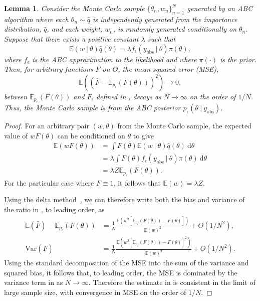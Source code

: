 \documentclass[12pt, onecolumn]{article}
\newcommand{\obs}[1]{#1_{\mathrm{obs}}}
\newtheorem{lemma}[theorem]{Lemma}
\begin{document}
\begin{lemma}
\label{lemma:MC}
Consider the Monte Carlo sample $\{ \theta_n, w_n \}_{n=1}^N$ generated by an ABC algorithm where each $\theta_n \sim \hat q$ is independently generated from the importance distribution, $\hat q$, and each weight, $w_n$, is randomly generated conditionally on $\theta_n$.
Suppose that there exists a positive constant $\lambda$ such that
\begin{equation}
\label{eq:ABCCondition}
\mathbb E(w~|~\theta) \hat q(\theta) = \lambda f_\epsilon(\obs y~|~\theta) \pi(\theta),
\end{equation}
where $f_\epsilon$ is the ABC approximation to the likelihood and where $\pi(\cdot)$ is the prior.
Then, for arbitrary functions $F$ on $\Theta$, the mean squared error (MSE),
\[
\mathbb E\left( \left( \bar F - \mathbb E_{p_\epsilon} \left(F(\theta) \right) \right)^2 \right) \rightarrow 0,
\]
between $\mathbb E_{p_\epsilon}(F(\theta))$ and $\bar F$, defined in , decays as $N \rightarrow \infty$ on the order of $1/N$.
Thus, the Monte Carlo sample is from the ABC posterior $p_\epsilon(\theta~|~\obs y)$.
\end{lemma}
\begin{proof}
For an arbitrary pair $(w, \theta)$ from the Monte Carlo sample, the expected value of $w F(\theta)$ can be conditioned on $\theta$ to give 
\begin{align*}
\mathbb E(w F(\theta)) 
&= \int F(\theta) \mathbb E(w~|~\theta) \hat q(\theta) ~\mathrm d\theta 
\\ 
&= \lambda \int F(\theta) f_\epsilon(\obs y~|~\theta) \pi(\theta) ~\mathrm d\theta 
\\
&= \lambda Z \mathbb E_{p_\epsilon}(F(\theta)).
\end{align*}
For the particular case where $F \equiv 1$, it follows that $\mathbb E(w) = \lambda Z$.

Using the delta method~\cite{Seltman2018}, we can therefore write both the bias and variance of the ratio in , to leading order, as
\begin{subequations}
\label{eq:estimate:MSE}
\begin{align}
\mathbb E \left( \bar F \right) - \mathbb E_{p_\epsilon}(F(\theta))
&= 
\frac{1}{N} \frac{\mathbb E \left( w^2 \left[ \mathbb E_{p_\epsilon}(F(\theta)) - F \left(\theta\right) \right] \right)}{\mathbb E(w)^2} + O(1/N^2),
\label{eq:estimate:bias}
\\
\mathrm{Var} \left( \bar F \right)
&=
\frac{1}{N} \frac{\mathbb E \left( w^2 \left[ \mathbb E_{p_\epsilon}(F(\theta)) - F\left(\theta\right) \right]^2 \right) }{\mathbb E(w)^2} + O(1/N^2).
\label{eq:estimate:variance}
\end{align}
\end{subequations}
Using the standard decomposition of the MSE into the sum of the variance and squared bias, it follows that, to leading order, the MSE is dominated by the variance term in  as $N \rightarrow \infty$.
Therefore the estimate in  is consistent in the limit of large sample size, with convergence in MSE on the order of $1/N$. 
\end{proof}
\end{document}
